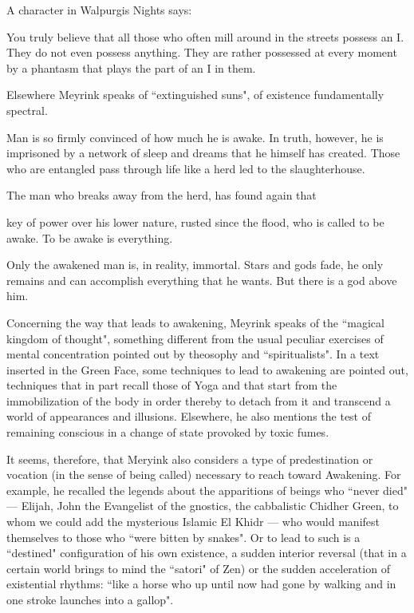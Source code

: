 A character in Walpurgis Nights says:

\begin{quotex}
You truly believe that all those who often mill around in the streets possess an I. They do not even possess anything. They are rather possessed at every moment by a phantasm that plays the part of an I in them. 

\end{quotex}
Elsewhere Meyrink speaks of ``extinguished suns", of existence fundamentally spectral.

\begin{quotex}
Man is so firmly convinced of how much he is awake. In truth, however, he is imprisoned by a network of sleep and dreams that he himself has created. Those who are entangled pass through life like a herd led to the slaughterhouse. 

\end{quotex}
The man who breaks away from the herd, has found again that

\begin{quotex}
key of power over his lower nature, rusted since the flood, who is called to be awake. To be awake is everything.

Only the awakened man is, in reality, immortal. Stars and gods fade, he only remains and can accomplish everything that he wants. But there is a god above him. 

\end{quotex}
Concerning the way that leads to awakening, Meyrink speaks of the ``magical kingdom of thought", something different from the usual peculiar exercises of mental concentration pointed out by theosophy and ``spiritualists". In a text inserted in the Green Face, some techniques to lead to awakening are pointed out, techniques that in part recall those of Yoga and that start from the immobilization of the body in order thereby to detach from it and transcend a world of appearances and illusions. Elsewhere, he also mentions the test of remaining conscious in a change of state provoked by toxic fumes.

It seems, therefore, that Meryink also considers a type of predestination or vocation (in the sense of being called) necessary to reach toward Awakening. For example, he recalled the legends about the apparitions of beings who ``never died" — Elijah, John the Evangelist of the gnostics, the cabbalistic Chidher Green, to whom we could add the mysterious Islamic El Khidr — who would manifest themselves to those who ``were bitten by snakes". Or to lead to such is a ``destined" configuration of his own existence, a sudden interior reversal (that in a certain world brings to mind the ``satori" of Zen) or the sudden acceleration of existential rhythms: ``like a horse who up until now had gone by walking and in one stroke launches into a gallop".

